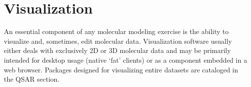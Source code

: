 \section{Visualization}
  
An essential component of any molecular modeling exercise is the ability to visualize and, sometimes, edit molecular data.  Visualization software usually either deals with exclusively 2D or 3D molecular data and may be primarily intended for desktop usage (native `fat' clients) or as a component embedded in a web browser.  Packages designed for visualizing entire datasets are cataloged in the QSAR section.